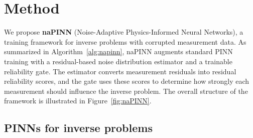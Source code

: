 \documentclass{article}
\theoremstyle{plain}
\theoremstyle{definition}
\theoremstyle{remark}
\begin{document}
\section{Method}
\label{sec:method}

We propose \textbf{naPINN} (Noise-Adaptive Physics-Informed Neural Networks), a training framework for inverse problems with corrupted measurement data. As summarized in Algorithm~\ref{alg:napinn}, naPINN augments standard PINN training with a residual-based noise distribution estimator and a trainable reliability gate. The estimator converts measurement residuals into residual reliability scores, and the gate uses these scores to determine how strongly each measurement should influence the inverse problem. The overall structure of the framework is illustrated in Figure~\ref{fig:naPINN}.

\subsection{PINNs for inverse problems}
\label{subsec:problem_setup}
\end{document}
